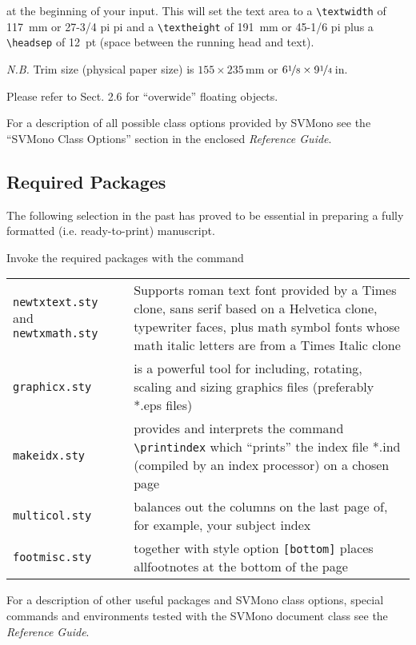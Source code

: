 \documentclass[graybox]{svmono}
\begin{document}
\cprotect{}

at the beginning of your input. This will set the text area to a \verb|\textwidth| of 117~mm or 27-3/4 pi pi and a \verb|\textheight| of 191~mm or 45-1/6 pi plus a \verb|\headsep| of 12~pt (space between the running head and text).

{\it N.B.} Trim size (physical paper size) is $155 \times 235$\,mm or $6\nicefrac{1}{8} \times 9\nicefrac{1}{4}$\,in.

Please refer to Sect. 2.6 for ``overwide'' floating objects.

For a description of all possible class options provided by {\sc SVMono} see the ``{\sc SVMono} Class Options'' section in the enclosed {\it Reference Guide}.

\subsection{Required Packages}

The following selection in the past has proved to be essential in preparing a fully formatted (i.e. ready-to-print) manuscript.

\pagebreak

Invoke the required packages with the command

\cprotect\boxtext{\verb|\usepackage{}|}

\begin{tabular}{p{7.5pc}@{\qquad}p{18.5pc}}
{\tt newtxtext.sty} and {\tt newtxmath.sty} & Supports roman text font provided by a Times clone,  sans serif based on a Helvetica clone,  typewriter faces,  plus math symbol fonts whose math italic letters are from a Times Italic clone\\
{\tt graphicx.sty} & is a powerful tool for including, rotating, scaling and sizing graphics files (preferably *.eps files) \\
{\tt makeidx.sty} & provides and interprets the command \verb|\printindex| which ``prints'' the index file *.ind (compiled by an index processor) on a chosen page \\
{\tt multicol.sty} & balances out the columns on the last page of, for exam­ple, your subject index \\
{\tt footmisc.sty} & together with style option {\tt [bottom]} places all\break footnotes at the bottom of the page
\end{tabular}

For a description of other useful packages and {\sc SVMono} class options, special commands and environments tested with the {\sc SVMono} document class see the {\it Reference Guide}.
\end{document}
